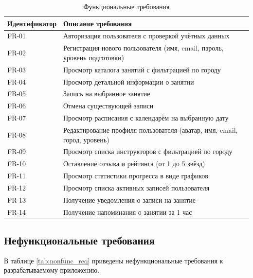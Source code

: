 \renewcommand{\arraystretch}{1.3}
\begin{table}[H]
	\centering
	\caption{Функциональные требования}
	\label{tab:func_req}
	\normalsize
	\setlength{\tabcolsep}{6pt}
	\begin{tabular}{|m{3.8cm}|m{10cm}|}
		\hline
		\textbf{Идентификатор} & \textbf{Описание требования} \\
		\hline
		FR-01 & Авторизация пользователя с проверкой учётных данных \\
		\hline
		FR-02 & Регистрация нового пользователя (имя, email, пароль, уровень подготовки) \\
		\hline
		FR-03 & Просмотр каталога занятий с фильтрацией по городу \\
		\hline
		FR-04 & Просмотр детальной информации о занятии \\
		\hline
		FR-05 & Запись на выбранное занятие \\
		\hline
		FR-06 & Отмена существующей записи \\
		\hline
		FR-07 & Просмотр расписания с календарём на выбранную дату \\
		\hline
		FR-08 & Редактирование профиля пользователя (аватар, имя, email, город, уровень) \\
		\hline
		FR-09 & Просмотр списка инструкторов с фильтрацией по городу \\
		\hline
		FR-10 & Оставление отзыва и рейтинга (от 1 до 5 звёзд) \\
		\hline
		FR-11 & Просмотр статистики прогресса в виде графиков \\
		\hline
		FR-12 & Просмотр списка активных записей пользователя \\
		\hline
		FR-13 & Получение уведомления о записи на занятие \\
		\hline
		FR-14 & Получение напоминания о занятии за 1 час \\
		\hline
	\end{tabular}
\end{table}
\renewcommand{\arraystretch}{1}

\subsection{Нефункциональные требования}

В таблице \ref{tab:nonfunc_req} приведены нефункциональные требования к разрабатываемому приложению.

